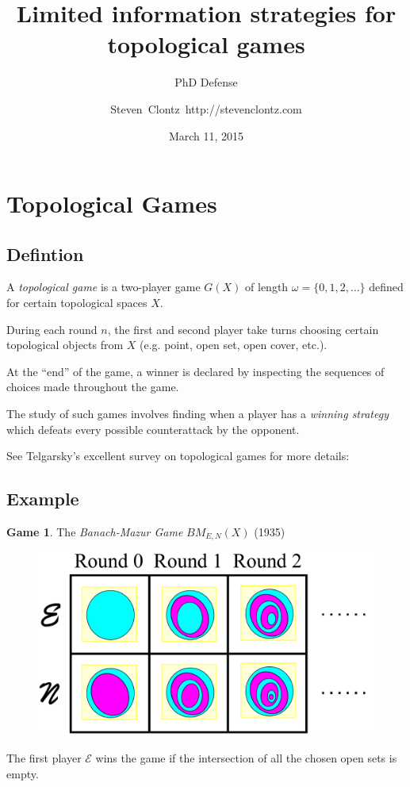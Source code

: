 \documentclass{beamer}
\title
{Limited information strategies for topological games}
\subtitle
{PhD Defense} %
\author%
{Steven~Clontz~http://stevenclontz.com}%
\institute[Auburn University] %
{
  Department of Mathematics and Statistics\\
  Auburn University}
\date[15-03-11] %
{March 11, 2015}
\theoremstyle{definition}
\newtheorem{game}[theorem]{Game}
\newcommand{\<}{\langle}
\renewcommand{\>}{\rangle}
\newcommand{\pl}[1]{\mathscr{#1}}
\newcommand{\term}{\textit}
\newcommand{\bmGame}[1]{{BM}_{E,N}(#1)}
\begin{document}
\renewcommand{\pause}{}
\newcommand{\vspacing}{\vspace{1em}}
\newcommand{\vpause}{\pause\vspacing}

\begin{frame}
  \titlepage
\end{frame}

\section{Topological Games}

\subsection{Defintion}

\begin{frame}
  A \term{topological game} is a two-player game $G(X)$ of length
  $\omega=\{0,1,2,\dots\}$ defined for certain topological spaces $X$.

  \vpause

  During each round $n$, the first and second player take turns choosing
  certain topological objects from $X$ (e.g. point, open set, open cover, etc.).

  \vpause

  At the ``end'' of the game, a winner is declared by inspecting the sequences
  of choices made throughout the game.

  \vpause

  The study of such games involves finding when a player has a
  \term{winning strategy} which defeats every possible counterattack by
  the opponent.

  \vpause

  {\tiny See Telgarsky's excellent survey on topological games for more
  details: \cite{MR892457}}
\end{frame}

\subsection{Example}

\begin{frame}
  \small
  \begin{game}
    The \term{Banach-Mazur Game}
    $\bmGame{X}$ (1935) \cite{MR666400}

    \begin{figure}
      \includegraphics[width=0.6\linewidth]{bmGameAlt.pdf}
    \end{figure}

  The first player $\pl E$ wins the game if the intersection of all the chosen
  open sets is empty.
  \end{game}
\end{frame}
\end{document}
